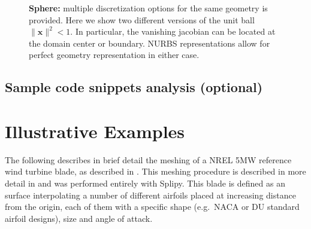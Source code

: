 \documentclass[preprint,12pt, a4paper]{elsarticle}
\begin{document}
\begin{figure}
  \begin{center}
    \hspace{.02\linewidth}
    \caption{\textbf{Sphere:} multiple discretization options for the same geometry is provided. Here we show two different versions of the unit ball $\|\mathbf{x}\|^2<1$. In particular, the vanishing jacobian can be located at the domain center or boundary. NURBS representations allow for perfect geometry representation in either case.}
    \label{fig:volume-disc}
  \end{center}
\end{figure}

\subsection{Sample code snippets analysis (optional)}
\label{}

\section{Illustrative Examples}
\label{sec:naca}

The following describes in brief detail the meshing of a NREL 5MW reference wind turbine blade, as described in \cite{Jonkman2009drw}.
This meshing procedure is described in more detail in \cite{Fonn2015sbm} and was performed entirely with Splipy.
This blade is defined as an surface interpolating a number of different airfoils placed at increasing distance from the origin, each of them with a specific shape (e.g.~NACA or DU standard airfoil designs), size and angle of attack.
\end{document}
